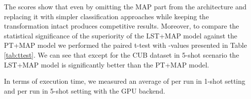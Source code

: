 \documentclass[letterpaper]{article} \usepackage{aaai20}  \usepackage{times}  \usepackage{helvet} \usepackage{courier}  \usepackage[hyphens]{url}  \usepackage{graphicx} \urlstyle{rm} \def\UrlFont{\rm}  \usepackage{graphicx}  \frenchspacing  \setlength{\pdfpagewidth}{8.5in}  \setlength{\pdfpageheight}{11in}  \usepackage[ruled,vlined]{algorithm2e}
\begin{document}
The scores show that even by omitting the MAP part from the architecture and replacing it with simpler classification approaches while keeping the transformation intact produces competitive results. Moreover, to compare the statistical significance of the superiority of the LST+MAP model against the PT+MAP model we performed the paired t-test with -values presented in Table \ref{tab:ttest}. We can see that except for the CUB dataset in 5-shot scenario the LST+MAP model is significantly better than the PT+MAP model.

In terms of execution time, we measured an average of  per run in 1-shot setting and  per run in 5-shot setting with the GPU backend.

\begin{table}[h!]
\caption{5-shot accuracy of models based on Power Transform (PT), our proposed Latent Space Transform (LST) and WideResNet backbone. The authors of the PT+MAP model presented accuracy  in 5-shot setting for CUB dataset, however we were able to obtain higher accuracy with their described model configuration.}
\vspace{5mm}
\label{tab:accuracies_5shot}
\centering
{}
\end{table}
\end{document}
